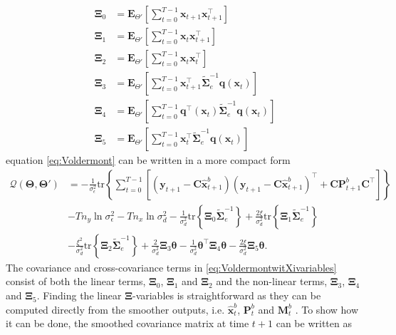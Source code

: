 \documentclass[]{article}
\begin{document}
\begin{align}
	\boldsymbol\Xi_{0}&=\mathbf E_{\Theta'}\left[\sum_{t=0}^{T-1}\mathbf x_{t+1}\mathbf x_{t+1}^\top\right]\label{eq:defofXi0} \\
\boldsymbol\Xi_{1}&=\mathbf E_{\Theta'}\left[\sum_{t=0}^{T-1}\mathbf x_t\mathbf x_{t+1}^\top\right]\label{eq:defofXi1} \\
\boldsymbol\Xi_{2}&=\mathbf E_{\Theta'}\left[\sum_{t=0}^{T-1}\mathbf x_t\mathbf x_{t}^\top\right]\label{eq:defofXi2}\\
\boldsymbol\Xi_{3}&=\mathbf E_{\Theta'}\left[\sum_{t=0}^{T-1}\mathbf x_{t+1}^\top\tilde{\boldsymbol\Sigma}_e^{-1}\mathbf q( \mathbf x_t)\right] \label{eq:defofXi3} \\	
\boldsymbol\Xi_{4}&= \mathbf E_{\Theta'}\left[\sum_{t=0}^{T-1}  \mathbf q^\top(\mathbf  x_t)\tilde{\boldsymbol\Sigma}_e^{-1} \mathbf q(\mathbf x_t)\right] \label{eq:defofXi4}\\
 \boldsymbol\Xi_{5}&=\mathbf E_{\Theta'}\left[\sum_{t=0}^{T-1} \mathbf x_t^\top\tilde{\boldsymbol\Sigma}_e^{-1}\mathbf q(\mathbf x_t)  \right] \label{eq:defofXi5}
 \end{align}
equation \eqref{eq:Voldermont} can be written in a more compact form
\begin{align}\label{eq:VoldermontwitXivariables}
 \mathcal Q(\boldsymbol \Theta,\boldsymbol\Theta')&=-\frac{1}{\sigma_{\epsilon}^2}\mathrm{tr}\left\lbrace\boldsymbol\sum_{t=0}^{T-1}\left[ (\mathbf y_{t+1}-\mathbf C\mathbf{\hat{x}}_{t+1}^b) (\mathbf y_{t+1}-\mathbf C\mathbf{\hat{x}}_{t+1}^b)^\top+\mathbf C \mathbf P_{t+1}^b\mathbf C^\top\right] \right\rbrace\nonumber \\
&-Tn_y\ln \sigma_{\epsilon}^2-Tn_x\ln\sigma_d^2-\frac{1}{\sigma_d^2}\mathrm{tr}\left\lbrace \boldsymbol\Xi_{0} \tilde{\boldsymbol\Sigma}_e^{-1}\right\rbrace +\frac{2\xi}{\sigma_d^2} \mathrm{tr}\left\lbrace \boldsymbol\Xi_{1} \tilde{\boldsymbol\Sigma}_e^{-1}\right\rbrace 
 \nonumber \\
&-\frac{\xi^2}{\sigma_d^2}\mathrm{tr} \left\lbrace\boldsymbol\Xi_{2}\tilde{\boldsymbol\Sigma}_e^{-1} \right\rbrace +\frac{2}{\sigma_d^2}\boldsymbol\Xi_{3}\boldsymbol\theta-\frac{1}{\sigma_d^2}\boldsymbol\theta^\top \boldsymbol\Xi_{4}\boldsymbol\theta-\frac{2\xi}{\sigma_d^2}\boldsymbol \Xi_{5} \boldsymbol\theta.
\end{align}
The covariance and cross-covariance terms in \eqref{eq:VoldermontwitXivariables} consist of both the linear terms, $\boldsymbol\Xi_0$, $\boldsymbol\Xi_1$ and $\boldsymbol\Xi_2$ and the non-linear terms, $\boldsymbol\Xi_3$, $\boldsymbol\Xi_4$ and  $\boldsymbol\Xi_5$. Finding the linear $\boldsymbol\Xi$-variables is straightforward as they can be computed directly from the smoother outputs, i.e. $\hat{\mathbf x}_t^b $, $\mathbf P_t^b$ and $\mathbf M_t^b$ \cite{Gibsona2005}. To show how it can be done, the smoothed covariance matrix at time $t+1$ can be written as
\end{document}
